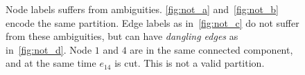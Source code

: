 \begin{center}
\begin{figure}[t]
\begin{tiny}
\end{tiny}
\vspace{-0.1cm}
\caption{
Node labels suffers from ambiguities.
\ref{fig:not_a} and~\ref{fig:not_b} encode the same partition.
Edge labels as in~\ref{fig:not_c} do not suffer from these 
ambiguities, but can have \emph{dangling edges} as in~\ref{fig:not_d}.
Node $1$ and $4$
are in the same connected component,
and at the same time $e_{14}$ is cut.
This is not a valid partition.
}\label{fig:notation}
\end{figure}
\end{center}

